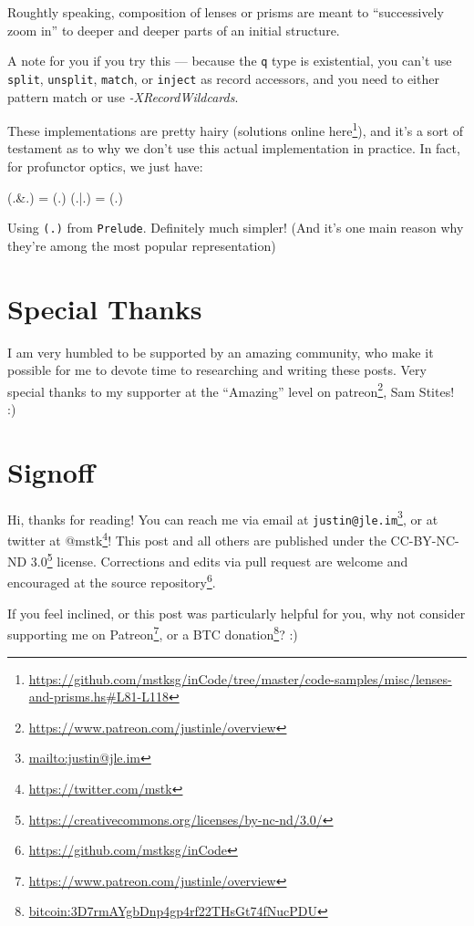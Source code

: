 \documentclass[]{article}
\newenvironment{Shaded}{}{}
\newcommand{\FunctionTok}[1]{\textcolor[rgb]{0.02,0.16,0.49}{#1}}
\newcommand{\NormalTok}[1]{#1}
\renewcommand{\href}[2]{#2\footnote{\url{#1}}}
\begin{document}
\begin{itemize}
  Roughtly speaking, composition of lenses or prisms are meant to ``successively
  zoom in'' to deeper and deeper parts of an initial structure.

  A note for you if you try this --- because the \texttt{q} type is existential,
  you can't use \texttt{split}, \texttt{unsplit}, \texttt{match}, or
  \texttt{inject} as record accessors, and you need to either pattern match or
  use \emph{-XRecordWildcards}.

  These implementations are pretty hairy (solutions
  \href{https://github.com/mstksg/inCode/tree/master/code-samples/misc/lenses-and-prisms.hs\#L81-L118}{online
  here}), and it's a sort of testament as to why we don't use this actual
  implementation in practice. In fact, for profunctor optics, we just have:

\begin{Shaded}
\begin{Highlighting}[]
\NormalTok{(}\FunctionTok{.&.}\NormalTok{) }\FunctionTok{=}\NormalTok{ (}\FunctionTok{.}\NormalTok{)}
\NormalTok{(}\FunctionTok{.|.}\NormalTok{) }\FunctionTok{=}\NormalTok{ (}\FunctionTok{.}\NormalTok{)}
\end{Highlighting}
\end{Shaded}

  Using \texttt{(.)} from \texttt{Prelude}. Definitely much simpler! (And it's
  one main reason why they're among the most popular representation)
\end{itemize}

\hypertarget{special-thanks}{%
\section{Special Thanks}\label{special-thanks}}

I am very humbled to be supported by an amazing community, who make it possible
for me to devote time to researching and writing these posts. Very special
thanks to my supporter at the ``Amazing'' level on
\href{https://www.patreon.com/justinle/overview}{patreon}, Sam Stites! :)

\hypertarget{signoff}{%
\section{Signoff}\label{signoff}}

Hi, thanks for reading! You can reach me via email at
\href{mailto:justin@jle.im}{\nolinkurl{justin@jle.im}}, or at twitter at
\href{https://twitter.com/mstk}{@mstk}! This post and all others are published
under the \href{https://creativecommons.org/licenses/by-nc-nd/3.0/}{CC-BY-NC-ND
3.0} license. Corrections and edits via pull request are welcome and encouraged
at \href{https://github.com/mstksg/inCode}{the source repository}.

If you feel inclined, or this post was particularly helpful for you, why not
consider \href{https://www.patreon.com/justinle/overview}{supporting me on
Patreon}, or a \href{bitcoin:3D7rmAYgbDnp4gp4rf22THsGt74fNucPDU}{BTC donation}?
:)
\end{document}
